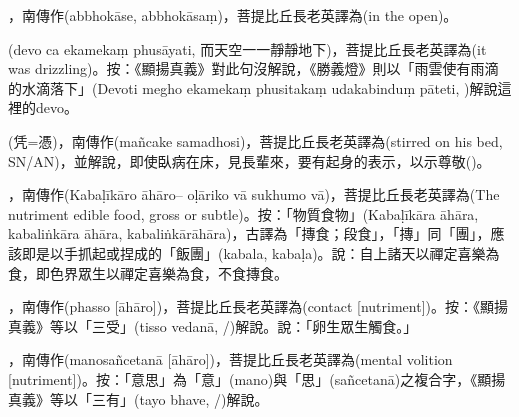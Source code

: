 \startitemgroup[noteitems]
\item{}，南傳作(abbhokāse, abbhokāsaṃ)，菩提比丘長老英譯為(in the open)。
\item{}(devo ca ekamekaṃ phusāyati, 而天空一一靜靜地下)，菩提比丘長老英譯為(it was drizzling)。按：《顯揚真義》對此句沒解說，《勝義燈》則以「雨雲使有雨滴的水滴落下」(Devoti megho ekamekaṃ phusitakaṃ udakabinduṃ pāteti, )解說這裡的devo。
\stopitemgroup

\startitemgroup[noteitems]
\item{}(凭=憑)，南傳作(mañcake samadhosi)，菩提比丘長老英譯為(stirred on his bed, SN/AN)，並解說，即使臥病在床，見長輩來，要有起身的表示，以示尊敬()。
\stopitemgroup

\startitemgroup[noteitems]
\item{}，南傳作(Kabaḷīkāro āhāro– oḷāriko vā sukhumo vā)，菩提比丘長老英譯為(The nutriment edible food, gross or subtle)。按：「物質食物」(Kabaḷīkāra āhāra, kabaliṅkāra āhāra, kabaliṅkārāhāra)，古譯為「摶食；段食」，「摶」同「團」，應該即是以手抓起或捏成的「飯團」(kabala, kabaḷa)。說：自上諸天以禪定喜樂為食，即色界眾生以禪定喜樂為食，不食摶食。
\stopitemgroup

\startitemgroup[noteitems]
\item{}，南傳作(phasso [āhāro])，菩提比丘長老英譯為(contact [nutriment])。按：《顯揚真義》等以「三受」(tisso vedanā, /)解說。說：「卵生眾生觸食。」
\stopitemgroup

\startitemgroup[noteitems]
\item{}，南傳作(manosañcetanā [āhāro])，菩提比丘長老英譯為(mental volition [nutriment])。按：「意思」為「意」(mano)與「思」(sañcetanā)之複合字，《顯揚真義》等以「三有」(tayo bhave, /)解說。
\stopitemgroup

